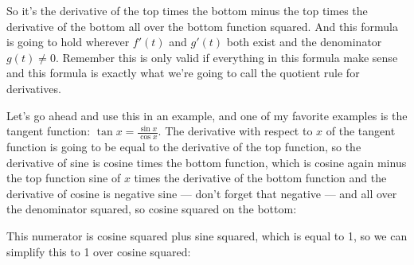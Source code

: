 \documentclass[pdftex, brazil, 12pt, twoside]{article}
\begin{document}
So it's the derivative of the top
times the bottom minus the top times the derivative
of the bottom all over the bottom function squared.
And this formula is going to hold wherever
$f'(t)$ and $g'(t)$ both exist and the denominator $g(t) \ne 0$.
Remember this is only valid if everything in this formula
make sense and this formula is exactly what we're
going to call the quotient rule for derivatives.

Let's go ahead and use this in an example,
and one of my favorite examples is the tangent function:
$\tan x = \frac{\sin x}{\cos x}$.
The derivative with respect to $x$ of the tangent function
is going to be equal to the derivative of the top function,
so the derivative of sine is cosine
times the bottom function, which is cosine again
minus the top function sine of $x$ times the derivative
of the bottom function and the derivative of cosine
is negative sine --- don't forget that negative --- and all
over the denominator squared, so cosine squared on the bottom:

\begin{figure}[H]
  \begin{center}
  \end{center}
\end{figure}

This numerator is cosine squared plus sine squared, which
is equal to 1, so we can simplify this to 1
over cosine squared:

\begin{figure}[H]
  \begin{center}
  \end{center}
\end{figure}
\end{document}
